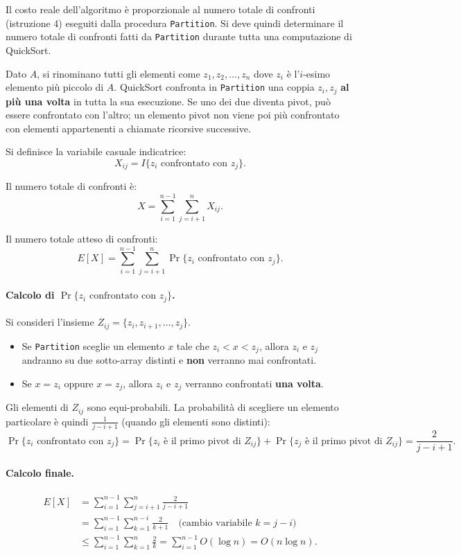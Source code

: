Il costo reale dell'algoritmo è proporzionale al numero totale di
confronti (istruzione 4) eseguiti dalla procedura \texttt{Partition}.
Si deve quindi determinare il numero totale di confronti fatti da
\texttt{Partition} durante tutta una computazione di QuickSort.

Dato $A$, si rinominano tutti gli elementi come $z_1, z_2, \ldots, z_n$
dove $z_i$ è l'$i$-esimo elemento più piccolo di $A$.
QuickSort confronta in \texttt{Partition} una coppia $z_i, z_j$
\textbf{al più una volta} in tutta la sua esecuzione. Se uno dei
due diventa pivot, può essere confrontato con l'altro; un elemento
pivot non viene poi più confrontato con elementi appartenenti a
chiamate ricorsive successive.

Si definisce la variabile casuale indicatrice:
\[
X_{ij} = I\{z_i \text{ confrontato con } z_j\}.
\]

Il numero totale di confronti è:
\[
X = \sum_{i=1}^{n-1}\sum_{j=i+1}^{n} X_{ij}.
\]

Il numero totale atteso di confronti:
\[
E[X] = \sum_{i=1}^{n-1}\sum_{j=i+1}^{n} \Pr\{z_i
\text{ confrontato con } z_j\}.
\]

\paragraph{Calcolo di $\Pr\{z_i \text{ confrontato con } z_j\}$.}
Si consideri l'insieme $Z_{ij} = \{z_i, z_{i+1}, \ldots, z_j\}$.
\begin{itemize}
	\item Se \texttt{Partition} sceglie un elemento $x$ tale che
	$z_i < x < z_j$, allora $z_i$ e $z_j$ andranno su due
	sotto-array distinti e \textbf{non} verranno mai confrontati.
	\item Se $x = z_i$ oppure $x = z_j$, allora $z_i$ e $z_j$ verranno
	confrontati \textbf{una volta}.
\end{itemize}
Gli elementi di $Z_{ij}$ sono equi-probabili. La probabilità di
scegliere un elemento particolare è quindi $\frac{1}{j-i+1}$
(quando gli elementi sono distinti):
\[
\Pr\{z_i \text{ confrontato con } z_j\}
= \Pr\{z_i \text{ è il primo pivot di } Z_{ij}\}
+ \Pr\{z_j \text{ è il primo pivot di } Z_{ij}\}
= \frac{2}{j-i+1}.
\]

\paragraph{Calcolo finale.}
\begin{align*}
	E[X]
	&= \sum_{i=1}^{n-1}\sum_{j=i+1}^{n} \frac{2}{j-i+1} \\
	&= \sum_{i=1}^{n-1}\sum_{k=1}^{n-i} \frac{2}{k+1}
	\quad\text{(cambio variabile } k = j-i\text{)}\\
	&\le \sum_{i=1}^{n-1}\sum_{k=1}^{n} \frac{2}{k}
	= \sum_{i=1}^{n-1} O(\log n)
	= O(n \log n).
\end{align*}

